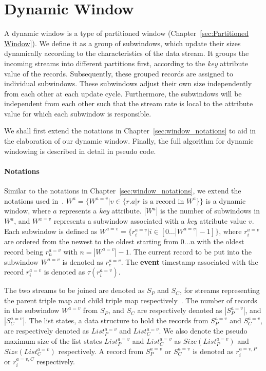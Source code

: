 \section{Dynamic Window}%
\label{sec:Dynamic Window}
A dynamic window is a type of partitioned window (Chapter~\ref{sec:Partitioned Window}).
We define it as a group of subwindows, which update their sizes dynamically according to the characteristics 
of the data stream. It groups the incoming streams into different partitions first, according to 
the \emph{key} attribute value of the records. Subsequently, these grouped records are assigned 
to individual subwindows. These subwindows adjust their own size independently from each other 
at each update cycle. Furthermore, the subwindows will be independent from each other such 
that the stream rate is local to the attribute value for which each subwindow is responsible. 

We shall first extend the notations in Chapter~\ref{sec:window_notations} to aid in the 
elaboration of our dynamic window. Finally, the full algorithm for dynamic windowing 
is described in detail in pseudo code. 


\paragraph{Notations}

Similar to the notations in Chapter~\ref{sec:window_notations}, we extend the 
notations used in~\cite{generic_window_sem}. 
$W^{a} = \{ W^{a=v} | v \in \{r.a | r \text{ is a record in } W^a\}\}$ is a dynamic window, 
where $a$ represents a \emph{key} attribute. $|W^a|$ is the number of subwindows 
in $W^a$, and $W^{a=v}$ represents a subwindow associated with a \emph{key} attribute value 
$v$. Each subwindow is defined as $W^{a=v} = \{r_{i}^{a=v} | i \in [0\dots|W^{a=v}|-1]\}$, 
where $r_{i}^{a=v}$ are ordered from the newest to the oldest starting from 
$0\dots n$ with the oldest record being $r_{n}^{a=v}$ with $n = |W^{a=v}|-1$. 
The current record to be put into the subwindow $W^{a=v}$ is denoted as $r_{c}^{a=v}$. 
The \textbf{event} timestamp associated with the record $r_{i}^{a=v}$ is denoted as 
$\tau(r_{i}^{a=v})$. 

The two streams to be joined are denoted as $S_P$ and $S_C$, for 
streams representing the parent triple map and child triple map respectively~\cite{rml}. 
The number of records in the subwindow $W^{a=v}$ from $S_P$, and $S_C$ are respectively 
denoted as $|S_{P}^{a=v}|$, and $|S_{C}^{a=v}|$. The list states, 
a data structure to hold the records from $S_P^{a=v}$ and $S_C^{a=v}$, 
are respectively denoted as $List_P^{a=v}$ and $List_C^{a=v}$. 
We also denote the 
pseudo maximum size of the list states  $List_P^{a=v}$ and $List_C^{a=v}$
as $Size(List_P^{a=v})$ and $Size(List_C^{a=v})$ respectively. A record from $S_P^{a=v}$ or $S_C^{a=v}$  
is denoted as $r_i^{a=v,P}$ or $r_i^{a=v, C}$ respectively.

